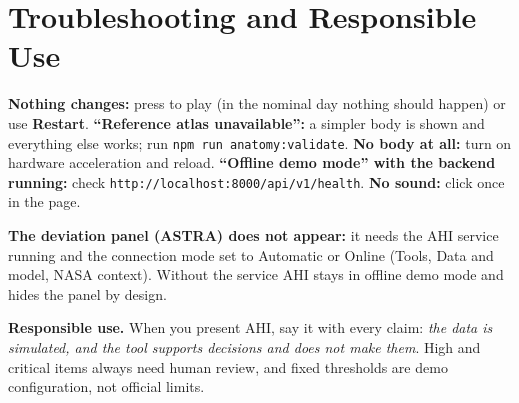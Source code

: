 \section{Troubleshooting and Responsible Use}
\label{sec:troubleshooting}

\textbf{Nothing changes:} press  to play (in the nominal day nothing should happen) or use \textbf{Restart}. \textbf{``Reference atlas unavailable'':} a simpler body is shown and everything else works; run \texttt{npm run anatomy:validate}. \textbf{No body at all:} turn on hardware acceleration and reload. \textbf{``Offline demo mode'' with the backend running:} check \texttt{http://localhost:8000/api/v1/health}. \textbf{No sound:} click once in the page.

\textbf{The deviation panel (ASTRA) does not appear:} it needs the AHI service running and the connection mode set to Automatic or Online (Tools, Data and model, NASA context). Without the service AHI stays in offline demo mode and hides the panel by design.

\noindent\textbf{Responsible use.} When you present AHI, say it with every claim: \textit{the data is simulated, and the tool supports decisions and does not make them}. High and critical items always need human review, and fixed thresholds are demo configuration, not official limits.
